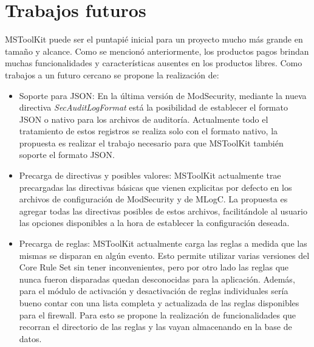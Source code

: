 \section{Trabajos futuros}
MSToolKit puede ser el puntapié inicial para un proyecto mucho más grande en tamaño y alcance. Como se mencionó anteriormente, los productos pagos brindan muchas funcionalidades y características ausentes en los productos libres. Como trabajos a un futuro cercano se propone la realización de:
\begin{itemize}
	\item Soporte para JSON: En la última versión de ModSecurity, mediante la nueva directiva \textit{SecAuditLogFormat} está la posibilidad de establecer el formato JSON o nativo para los archivos de auditoría. Actualmente todo el tratamiento de estos registros se realiza solo con el formato nativo, la propuesta es realizar el trabajo necesario para que MSToolKit también soporte el formato JSON.
	\item Precarga de directivas y posibles valores: MSToolKit actualmente trae precargadas las directivas básicas que vienen explicitas por defecto en los archivos de configuración de ModSecurity y de MLogC. La propuesta es agregar todas las directivas posibles de estos archivos, facilitándole al usuario las opciones disponibles a la hora de establecer la configuración deseada.
	\item Precarga de reglas: MSToolKit actualmente carga las reglas a medida que las mismas se disparan en algún evento. Esto permite utilizar varias versiones del Core Rule Set sin tener inconvenientes, pero por otro lado las reglas que nunca fueron disparadas quedan desconocidas para la aplicación. Además, para el módulo de activación y desactivación de reglas individuales sería bueno contar con una lista completa y actualizada de las reglas disponibles para el firewall. Para esto se propone la realización de funcionalidades que recorran el directorio de las reglas y las vayan almacenando en la base de datos.
\end{itemize}

